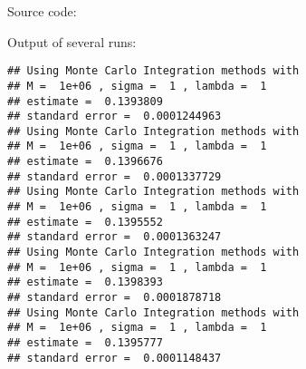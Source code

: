 Source code:\\
\begin{knitrout}
\color{fgcolor}\begin{kframe}
\begin{alltt}
 \hlkwb{=} 
 \hlkwb{=} 
 \hlkwb{=} \hlstd{(}\hlstd{,}\hlstd{)}
  \hlopt{/}\hlopt{*}\hlstd{(}\hlopt{*}\hlopt{*}\hlopt{^}\hlopt{+}\hlopt{*}\hlopt{+}\hlopt{+}\hlopt{+}\hlstd{))}\hlopt{^}\hlstd{(}\hlopt{-}\hlopt{-}\hlstd{(}\hlopt{^}\hlstd{)}\hlopt{*}\hlopt{^}\hlopt{/}\hlopt{/}\hlopt{^}\hlopt{+}

\hlkwb{=}\hlopt{^}

 \hlkwb{=} \hlopt{/}
 \hlkwb{=} 
 \hlkwb{=} 
 \hlkwb{=} 
 \hlkwb{=} \hlopt{/}
\hlstd{(}\hlstd{)}
\hlstd{(}\hlstd{)}
\hlstd{(}\hlstd{)}
\hlstd{(}\hlstd{)}
\end{alltt}
\end{kframe}
\end{knitrout}
Output of several runs:
\begin{knitrout}
\color{fgcolor}\begin{kframe}
\begin{verbatim}
## Using Monte Carlo Integration methods with 
## M =  1e+06 , sigma =  1 , lambda =  1 
## estimate =  0.1393809 
## standard error =  0.0001244963
## Using Monte Carlo Integration methods with 
## M =  1e+06 , sigma =  1 , lambda =  1 
## estimate =  0.1396676 
## standard error =  0.0001337729
## Using Monte Carlo Integration methods with 
## M =  1e+06 , sigma =  1 , lambda =  1 
## estimate =  0.1395552 
## standard error =  0.0001363247
## Using Monte Carlo Integration methods with 
## M =  1e+06 , sigma =  1 , lambda =  1 
## estimate =  0.1398393 
## standard error =  0.0001878718
## Using Monte Carlo Integration methods with 
## M =  1e+06 , sigma =  1 , lambda =  1 
## estimate =  0.1395777 
## standard error =  0.0001148437
\end{verbatim}
\end{kframe}
\end{knitrout}
